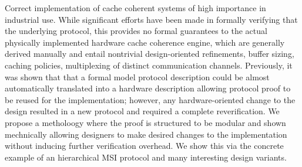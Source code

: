 
Correct implementation of cache coherent systems of high importance in
industrial use. While significant efforts have been made in formally
verifying that the underlying protocol, this provides no formal
guarantees to the actual physically implemented hardware cache
coherence engine, which are generally derived manually and entail
nontrivial design-oriented refinements, \eg{} buffer sizing, caching
policies, multiplexing of distinct communication channels. Previously,
it was shown that that a formal model protocol description could be
almost automatically translated into a hardware description allowing
protocol proof to be reused for the implementation; however, any
hardware-oriented change to the design resulted in a new protocol and
required a complete reverification. We propose a metholoogy where the
proof is structured to be modular and shown mechnically allowing
designers to make desired changes to the implementation without
inducing further verification overhead. We show this via the concrete
example of an hierarchical MSI protocol and many interesting design variants.


